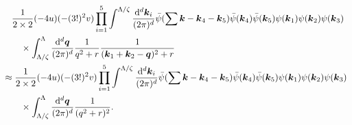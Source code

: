 \documentclass[hyperref, UTF8, a4paper]{ctexart}
\begin{document}
\begin{equation}
    \begin{aligned}
        &\quad \frac{1}{2 \times 2} (-4 u)(-(3!)^2 v) \prod_{i=1}^5 \int^{\Lambda / \zeta} \frac{\dd[d]{\vb*{k}_i}}{(2\pi)^d} \bar{\psi}(\sum \vb*{k} - \vb*{k}_4 - \vb*{k}_5) \bar{\psi}(\vb*{k}_4) \bar{\psi}(\vb*{k}_5) \psi(\vb*{k}_1) \psi(\vb*{k}_2) \psi(\vb*{k}_3) \\
        &\quad \quad \times \int_{\Lambda / \zeta}^\Lambda \frac{\dd[d]{\vb*{q}}}{(2\pi)^d} \frac{1}{q^2 + r} \frac{1}{(\vb*{k}_1 + \vb*{k}_2 - \vb*{q})^2 + r} \\
        &\approx \frac{1}{2 \times 2} (-4 u)(-(3!)^2 v) \prod_{i=1}^5 \int^{\Lambda / \zeta} \frac{\dd[d]{\vb*{k}_i}}{(2\pi)^d} \bar{\psi}(\sum \vb*{k} - \vb*{k}_4 - \vb*{k}_5) \bar{\psi}(\vb*{k}_4) \bar{\psi}(\vb*{k}_5) \psi(\vb*{k}_1) \psi(\vb*{k}_2) \psi(\vb*{k}_3) \\
        &\quad \quad \times \int_{\Lambda / \zeta}^\Lambda \frac{\dd[d]{\vb*{q}}}{(2\pi)^d} \frac{1}{(q^2 + r)^2}.
    \end{aligned}
    \label{eq:correction-v-3}
\end{equation}
\end{document}
